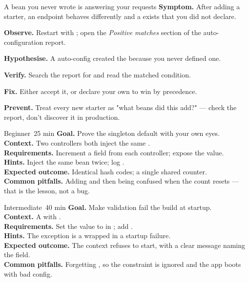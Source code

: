 \begin{debuglab}{A bean you never wrote is answering your requests}
\textbf{Symptom.} After adding a starter, an endpoint behaves differently and a  exists that you did not declare.

\begin{tickcheck}
  \item \textbf{Observe.} Restart with ; open the \emph{Positive matches} section of the auto-configuration report.
  \item \textbf{Hypothesise.} A  auto-config created the  because you never defined one.
  \item \textbf{Verify.} Search the report for  and read the matched condition.
  \item \textbf{Fix.} Either accept it, or declare your own  to win by  precedence.
  \item \textbf{Prevent.} Treat every new starter as "what beans did this add?" — check the report, don't discover it in production.
\end{tickcheck}
\end{debuglab}


\begin{minilab}{Beginner}{~25 min}
\textbf{Goal.} Prove the singleton default with your own eyes.\\
\textbf{Context.} Two controllers both inject the same .\\
\textbf{Requirements.} Increment a field from each controller; expose the value.\\
\textbf{Hints.} Inject the same bean twice; log .\\
\textbf{Expected outcome.} Identical hash codes; a single shared counter.\\
\textbf{Common pitfalls.} Adding  and then being confused when the count resets — that is the lesson, not a bug.
\end{minilab}

\begin{minilab}{Intermediate}{~40 min}
\textbf{Goal.} Make  validation fail the build at startup.\\
\textbf{Context.} A  with .\\
\textbf{Requirements.} Set the value to  in ; add .\\
\textbf{Hints.} The exception is a  wrapped in a startup failure.\\
\textbf{Expected outcome.} The context refuses to start, with a clear message naming the field.\\
\textbf{Common pitfalls.} Forgetting , so the constraint is ignored and the app boots with bad config.
\end{minilab}

